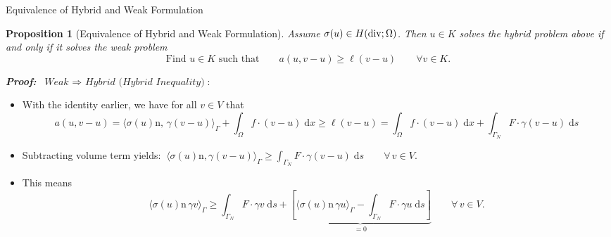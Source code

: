 \documentclass[10pt,aspectratio=169]{beamer}
\newtheorem{proposition}{Proposition}[section]
\def\d{{\mathrm{d}}}
\def\dx{{\d x}}
\def\ds{{\d s}}
\newcommand{\diver}{\operatornamewithlimits{div}}
\begin{document}
\begin{frame}{Equivalence of Hybrid and Weak Formulation}
	\begin{proposition}[Equivalence of Hybrid and Weak Formulation]
		Assume $\sigma(u)\in H(\diver;\Omega)$. Then $u\in K$ solves the hybrid problem above if and only if it solves the weak problem
		\begin{equation*}
			\text{Find }u\in K\text{ such that}\qquad a(u,v-u)\ge\ell(v-u)\qquad \forall v\in K.
		\end{equation*}
	\end{proposition}
	\textbf{\em Proof:} $\ \textit{Weak }\Rightarrow\textit{ Hybrid (Hybrid Inequality)}$:
	\begin{itemize}
		\item With the identity earlier, we have for all $v\in V$ that
		      \begin{equation*}
			      a(u,v-u) = \langle \sigma(u)\mathrm{n},\, \gamma(v-u)\rangle_\Gamma + \int_\Omega f\cdot(v-u)\;\dx \ge \ell(v-u)=\int_\Omega f\cdot(v-u)\;\dx +\int_{\Gamma_N}F\cdot\gamma(v-u)\;\ds
		      \end{equation*}
		\item Subtracting volume term yields: $\ \displaystyle  \langle \sigma(u)\mathrm n,\gamma(v-u)\rangle_\Gamma \ge\int_{\Gamma_N}F\cdot\gamma(v-u)\;\ds\qquad \forall\,v\in V$.
		\item This means
		      \begin{equation*}
			      \langle\sigma(u)\mathrm{n}\,\gamma v\rangle_\Gamma\ge \int_{\Gamma_N}F\cdot \gamma v\;\ds + \underbrace{\left[\langle\sigma(u)\mathrm{n}\,\gamma u\rangle_\Gamma-\int_{\Gamma_N}F\cdot\gamma u\;\ds\right]}_{ = 0}\qquad \forall\,v\in V.
		      \end{equation*}
	\end{itemize}
\end{frame}
\end{document}
